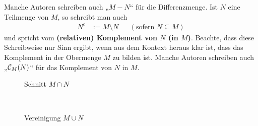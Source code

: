 \begin{de}
\begin{itemize}
        Manche Autoren schreiben auch „$M-N$“ für die Differenzmenge. Ist $N$ eine Teilmenge von $M$, so schreibt man auch
        \begin{align*}
            N^c & := M\setminus N && (\text{sofern $N\subseteq M$})
        \end{align*}
        und spricht vom \textbf{(relativen) Komplement von $N$ (in $M$)}. Beachte, dass diese Schreibweise nur Sinn ergibt, wenn aus dem Kontext heraus klar ist, dass das Komplement in der Obermenge $M$ zu bilden ist. Manche Autoren schreiben auch „$\mathcal C_M(N)$“ für das Komplement von $N$ in $M$.
	\end{itemize}
    \begin{figure}[ht]
        \begin{minipage}{.48\textwidth}
            \centering
            \caption{Schnitt $M\cap N$}
        \end{minipage}
        \quad
        \begin{minipage}{.48\textwidth}
            \centering
            \caption{Vereinigung $M\cup N$}
        \end{minipage}
        \quad\\[1em]
        \begin{minipage}{.48\textwidth}
            \centering

\end{minipage}
\end{figure}
\end{de}
